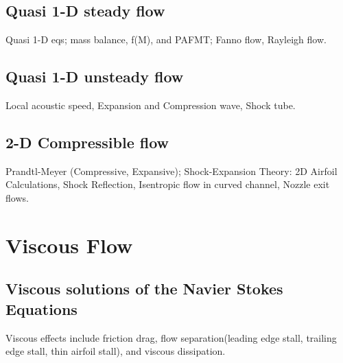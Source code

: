 \documentclass[oneside,a4paper,11pt]{report}
\begin{document}
%
\chapter{Quasi 1-D steady flow}
%
Quasi 1-D eqs; mass balance, f(M), and PAFMT; Fanno flow, Rayleigh flow.

%
\chapter{Quasi 1-D unsteady flow}
%
Local acoustic speed, Expansion and Compression wave, Shock tube.

%
\chapter{2-D Compressible flow}
%
Prandtl-Meyer (Compressive, Expansive); Shock-Expansion Theory: 2D Airfoil Calculations, Shock Reflection, Isentropic flow in curved channel, Nozzle exit flows.

\part{Viscous Flow}                                                           %

%
\chapter{Viscous solutions of the Navier Stokes Equations}
%
Viscous effects include friction drag, flow separation(leading edge stall, trailing edge stall, thin airfoil stall), and viscous dissipation.
\end{document}
